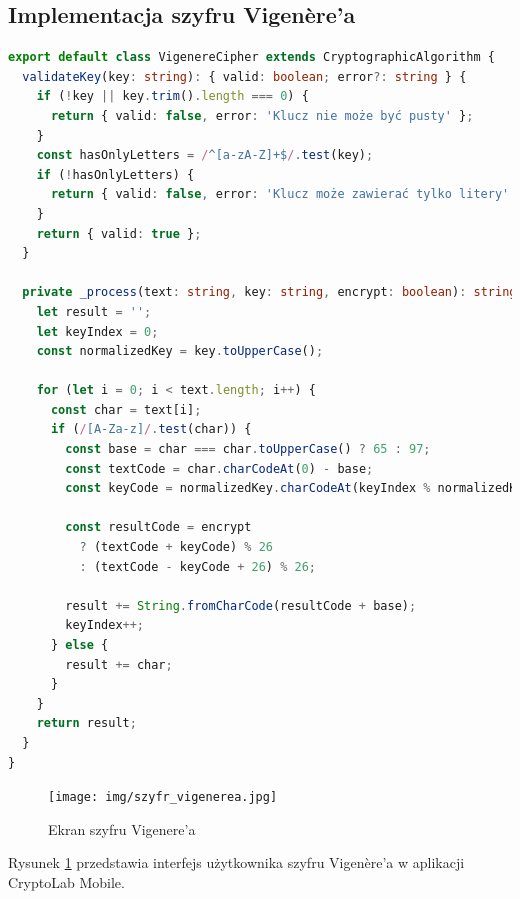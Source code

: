 \documentclass[12pt,a4paper]{article}
\begin{document}
\newpage
\subsection{Implementacja szyfru Vigenère'a}
\begin{lstlisting}[language=TypeScript, caption={Fragmenty klasy VigenereCipher}]
export default class VigenereCipher extends CryptographicAlgorithm {
  validateKey(key: string): { valid: boolean; error?: string } {
    if (!key || key.trim().length === 0) {
      return { valid: false, error: 'Klucz nie może być pusty' };
    }
    const hasOnlyLetters = /^[a-zA-Z]+$/.test(key);
    if (!hasOnlyLetters) {
      return { valid: false, error: 'Klucz może zawierać tylko litery' };
    }
    return { valid: true };
  }

  private _process(text: string, key: string, encrypt: boolean): string {
    let result = '';
    let keyIndex = 0;
    const normalizedKey = key.toUpperCase();
    
    for (let i = 0; i < text.length; i++) {
      const char = text[i];
      if (/[A-Za-z]/.test(char)) {
        const base = char === char.toUpperCase() ? 65 : 97;
        const textCode = char.charCodeAt(0) - base;
        const keyCode = normalizedKey.charCodeAt(keyIndex % normalizedKey.length) - 65;
        
        const resultCode = encrypt 
          ? (textCode + keyCode) % 26 
          : (textCode - keyCode + 26) % 26;
        
        result += String.fromCharCode(resultCode + base);
        keyIndex++;
      } else {
        result += char;
      }
    }
    return result;
  }
}
\end{lstlisting}

\newpage
\begin{figure}[H]
    \centering
    \texttt{[image: img/szyfr\_vigenerea.jpg]}
    \caption{Ekran szyfru Vigenere'a}
    \label{fig:szyfrv}
\end{figure}
Rysunek \ref{fig:szyfrv} przedstawia interfejs użytkownika szyfru Vigenère'a w aplikacji CryptoLab Mobile.
\end{document}
